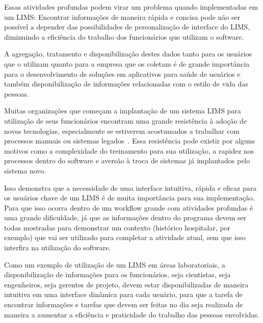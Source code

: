 
Essas atividades profundas podem virar um problema quando implementadas em um LIMS: Encontrar informações de maneira rápida e concisa pode não ser possível a depender das possibilidades de personalização de interface do LIMS, diminuindo a eficiência do trabalho dos funcionários que utilizam o software.




A agregação, tratamento e disponibilização destes dados tanto para os usuários que o utilizam quanto para a empresa que os coletam é de grande importância para o desenvolvimento de soluções em aplicativos para saúde de usuários e também disponibilização de informações relacionadas com o estilo de vida das pessoas.


Muitas organizações que começam a implantação de um sistema LIMS para utilização de seus funcionários encontram uma grande resistência à adoção de novas tecnologias, especialmente se estiverem acostumados a trabalhar com processos manuais ou sistemas legados~\cite{2018CommonAstrix}. Essa resistência pode existir por alguns motivos como a complexidade do treinamento para sua utilização, a rapidez nos processos dentro do software e aversão à troca de sistemas já implantados pelo sistema novo.

Isso demonstra que a necessidade de uma interface intuitiva, rápida e eficaz para os usuários chave de um LIMS é de muita importância para sua implementação. Para que isso ocorra dentro de um workflow grande com atividades profundas é uma grande dificuldade, já que as informações dentro do programa devem ser todas mostradas para demonstrar um contexto (histórico hospitalar, por exemplo) que vai ser utilizado para completar a atividade atual, sem que isso interfira na utilização do software.


Como um exemplo de utilização de um LIMS em áreas laboratoriais, a disponibilização de informações para os funcionários, seja cientistas, seja engenheiros, seja gerentes de projeto, devem estar disponibilizadas de maneira intuitiva em uma interface dinâmica para cada usuário, para que a tarefa de encontrar informações e tarefas que devem ser feitas no dia seja realizada de maneira a aumentar a eficiência e praticidade do trabalho das pessoas envolvidas.